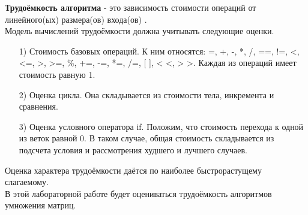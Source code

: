 \textbf{Трудоёмкость алгоритма} - это зависимость стоимости операций от линейного(ых) размера(ов) входа(ов) \cite{labor_int}.\\

Модель вычислений трудоёмкости должна учитывать следующие оценки.
\begin{itemize}
	\item[1)] Стоимость базовых операций. К ним относятся: =, +, -, *, /, ==, !=, <, <=, >, >=, \%, +=, -=, *=, /=, [ ], < <, > >. Каждая из операций имеет стоимость равную 1.
	\item[2)] Оценка цикла. Она складывается из стоимости тела, инкремента и сравнения. 
	\item[3)] Оценка условного оператора if. Положим, что стоимость перехода к одной из веток равной 0. В таком случае, общая стоимость складывается из подсчета условия и рассмотрения худшего и лучшего случаев.
\end{itemize}

Оценка характера трудоёмкости даётся по наиболее быстрорастущему слагаемому.\\

В этой лабораторной работе будет оцениваться трудоёмкость алгоритмов умножения матриц.